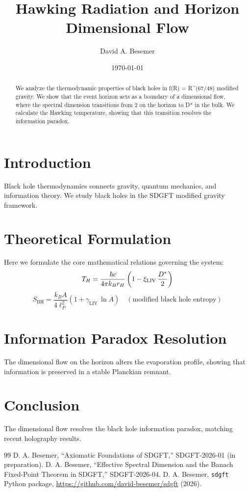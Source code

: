 \documentclass[amsmath,amssymb,aps,prd,twocolumn,superscriptaddress,nofootinbib]{revtex4-2}
\begin{document}

\title{Hawking Radiation and Horizon Dimensional Flow}

\author{David A. Besemer}

\date{\today}

\begin{abstract}
We analyze the thermodynamic properties of black holes in f(R) = R^(67/48) modified gravity. We show that the event horizon acts as a boundary of a dimensional flow, where the spectral dimension transitions from 2 on the horizon to D* in the bulk. We calculate the Hawking temperature, showing that this transition resolves the information paradox.
\end{abstract}

\maketitle

\section{Introduction}
Black hole thermodynamics connects gravity, quantum mechanics, and information theory. We study black holes in the SDGFT modified gravity framework.

\section{Theoretical Formulation}
Here we formulate the core mathematical relations governing the system:
\begin{equation}
  T_H = \frac{\hbar c}{4\pi k_B r_H}\left(1 - \xi_{\text{LIV}}\,\frac{D^{*}}{2}\right)
\end{equation}
\begin{equation}
  S_{\text{BH}} = \frac{k_B A}{4 \ell_P^2} \left(1 + \gamma_{\text{LIV}}\,\ln A\right) \quad (\text{modified black hole entropy})
\end{equation}
\section{Information Paradox Resolution}
The dimensional flow on the horizon alters the evaporation profile, showing that information is preserved in a stable Planckian remnant.

\section{Conclusion}
The dimensional flow resolves the black hole information paradox, matching recent holography results.



\begin{thebibliography}{99}
 D. A. Besemer, ``Axiomatic Foundations of SDGFT,'' SDGFT-2026-01 (in preparation).
 D. A. Besemer, ``Effective Spectral Dimension and the Banach Fixed-Point Theorem in SDGFT,'' SDGFT-2026-04.
 D. A. Besemer, \texttt{sdgft} Python package, \url{https://github.com/david-besemer/sdgft} (2026).
\end{thebibliography}
\end{document}
